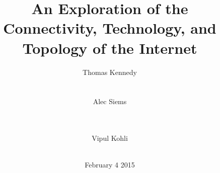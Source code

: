 \documentclass{sigcomm-alternate}
\begin{document}
%
\title{An Exploration of the Connectivity, Technology, and Topology of the Internet} 
%
%
%
%
%
%
\author{
%
%
\alignauthor
{Thomas Kennedy}\\
       \\
       \\
\alignauthor
{Alec Siems}\\
       \\
       \\
\and  %
\alignauthor 
{Vipul Kohli}\\
       \\
}
\date{February 4 2015}
\end{document}
